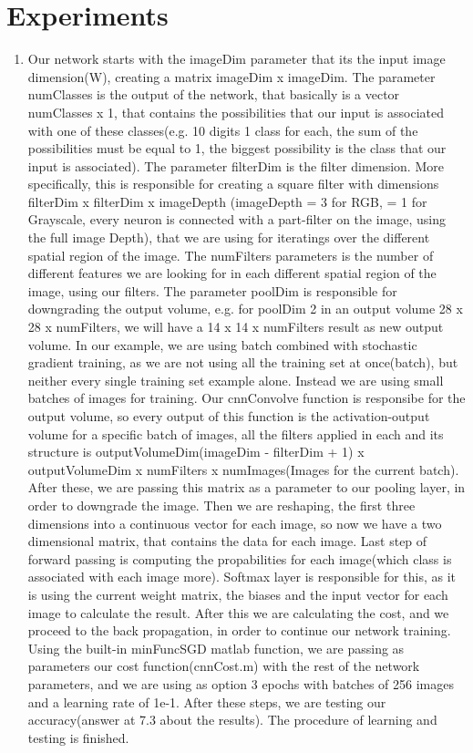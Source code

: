 \documentclass{article}
\begin{document}
\section{Experiments}
\begin{enumerate}
\item Our network starts with the imageDim parameter that its the input image dimension(W), creating a matrix imageDim x imageDim. The parameter numClasses is the output of the network, that basically is a vector numClasses x 1, that contains the possibilities that our input is associated with one of these classes(e.g. 10 digits 1 class for each, the sum of the possibilities must be equal to 1, the biggest possibility is the class that our input is associated). The parameter filterDim is the filter dimension. More specifically, this is responsible for creating a square filter with dimensions filterDim x filterDim x imageDepth (imageDepth = 3 for RGB, = 1 for Grayscale, every neuron is connected with a part-filter on the image, using the full image Depth), that we are using for iteratings over the different spatial region of the image. The numFilters parameters is the number of different features we are looking for in each different spatial region of the image, using our filters. The parameter poolDim is responsible for downgrading the output volume, e.g. for poolDim 2 in an output volume 28 x 28 x numFilters, we will have a 14 x 14 x numFilters result as new output volume. In our example, we are using batch combined with stochastic gradient training, as we are not using all the training set at once(batch), but neither every single training set example alone. Instead we are using small batches of images for training. Our cnnConvolve function is responsibe for the output volume, so every output of this function is the activation-output volume for a specific batch of images, all the filters applied in each and its structure is outputVolumeDim(imageDim - filterDim + 1) x outputVolumeDim x numFilters x numImages(Images for the current batch). After these, we are passing this matrix as a parameter to our pooling layer, in order to downgrade the image. Then we are reshaping, the first three dimensions into a continuous vector for each image, so now we have a two dimensional matrix, that contains the data for each image. Last step of forward passing is computing the propabilities for each image(which class is associated with each image more). Softmax layer is responsible for this, as it is using the current weight matrix, the biases and the input vector for each image to calculate the result. After this we are calculating the cost, and we proceed to the back propagation, in order to continue our network training. Using the built-in minFuncSGD matlab function, we are passing as parameters our cost function(cnnCost.m) with the rest of the network parameters, and we are using as option 3 epochs with batches of 256 images and a learning rate of 1e-1. After these steps, we are testing our accuracy(answer at 7.3 about the results). The procedure of learning and testing is finished.

\end{enumerate}
\end{document}
